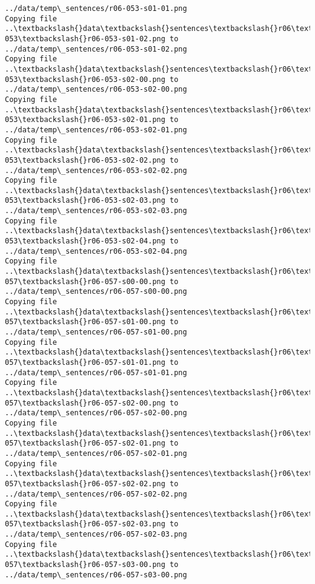 \documentclass[11pt]{article}
\begin{document}
\begin{Verbatim}[commandchars=\\\{\}]
../data/temp\_sentences/r06-053-s01-01.png
Copying file ..\textbackslash{}data\textbackslash{}sentences\textbackslash{}r06\textbackslash{}r06-053\textbackslash{}r06-053-s01-02.png to
../data/temp\_sentences/r06-053-s01-02.png
Copying file ..\textbackslash{}data\textbackslash{}sentences\textbackslash{}r06\textbackslash{}r06-053\textbackslash{}r06-053-s02-00.png to
../data/temp\_sentences/r06-053-s02-00.png
Copying file ..\textbackslash{}data\textbackslash{}sentences\textbackslash{}r06\textbackslash{}r06-053\textbackslash{}r06-053-s02-01.png to
../data/temp\_sentences/r06-053-s02-01.png
Copying file ..\textbackslash{}data\textbackslash{}sentences\textbackslash{}r06\textbackslash{}r06-053\textbackslash{}r06-053-s02-02.png to
../data/temp\_sentences/r06-053-s02-02.png
Copying file ..\textbackslash{}data\textbackslash{}sentences\textbackslash{}r06\textbackslash{}r06-053\textbackslash{}r06-053-s02-03.png to
../data/temp\_sentences/r06-053-s02-03.png
Copying file ..\textbackslash{}data\textbackslash{}sentences\textbackslash{}r06\textbackslash{}r06-053\textbackslash{}r06-053-s02-04.png to
../data/temp\_sentences/r06-053-s02-04.png
Copying file ..\textbackslash{}data\textbackslash{}sentences\textbackslash{}r06\textbackslash{}r06-057\textbackslash{}r06-057-s00-00.png to
../data/temp\_sentences/r06-057-s00-00.png
Copying file ..\textbackslash{}data\textbackslash{}sentences\textbackslash{}r06\textbackslash{}r06-057\textbackslash{}r06-057-s01-00.png to
../data/temp\_sentences/r06-057-s01-00.png
Copying file ..\textbackslash{}data\textbackslash{}sentences\textbackslash{}r06\textbackslash{}r06-057\textbackslash{}r06-057-s01-01.png to
../data/temp\_sentences/r06-057-s01-01.png
Copying file ..\textbackslash{}data\textbackslash{}sentences\textbackslash{}r06\textbackslash{}r06-057\textbackslash{}r06-057-s02-00.png to
../data/temp\_sentences/r06-057-s02-00.png
Copying file ..\textbackslash{}data\textbackslash{}sentences\textbackslash{}r06\textbackslash{}r06-057\textbackslash{}r06-057-s02-01.png to
../data/temp\_sentences/r06-057-s02-01.png
Copying file ..\textbackslash{}data\textbackslash{}sentences\textbackslash{}r06\textbackslash{}r06-057\textbackslash{}r06-057-s02-02.png to
../data/temp\_sentences/r06-057-s02-02.png
Copying file ..\textbackslash{}data\textbackslash{}sentences\textbackslash{}r06\textbackslash{}r06-057\textbackslash{}r06-057-s02-03.png to
../data/temp\_sentences/r06-057-s02-03.png
Copying file ..\textbackslash{}data\textbackslash{}sentences\textbackslash{}r06\textbackslash{}r06-057\textbackslash{}r06-057-s03-00.png to
../data/temp\_sentences/r06-057-s03-00.png

\end{Verbatim}
\end{document}
